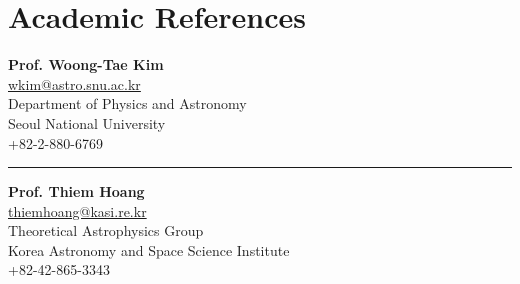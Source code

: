 \documentclass[11pt,letterpaper,roman]{moderncv}        %
\begin{document}

\section{Academic References}

{\textbf{Prof. Woong-Tae Kim}\\
  \href{mailto:wkim@wkim.astro.snu.ac.kr}{\color{dodgerblue}wkim@astro.snu.ac.kr}\\
  Department of Physics and Astronomy\\
  Seoul National University\\
  +82-2-880-6769}

\rule[-0.9ex]{-2.5pt}{3ex}

{\textbf{Prof. Thiem Hoang}\\
  \href{mailto:thiemhoang@kasi.re.kr}{\color{dodgerblue}thiemhoang@kasi.re.kr}\\
  Theoretical Astrophysics Group\\
  Korea Astronomy and Space Science Institute\\
  +82-42-865-3343}
\end{document}
